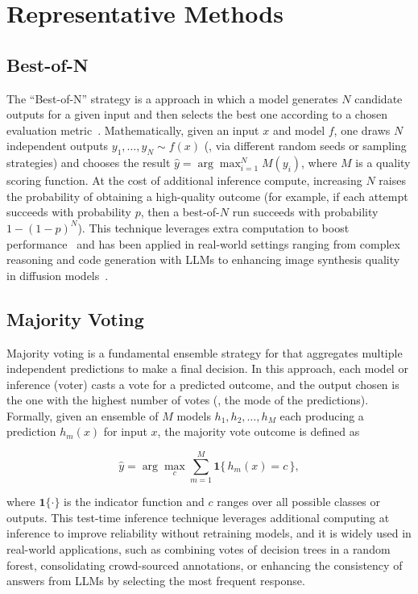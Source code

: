 
\section{Representative Methods}

\subsection{Best-of-N}

The ``Best-of-N'' strategy is a \TTS approach in which a model generates $N$ candidate outputs for a given input and then selects the best one according to a chosen evaluation metric~\citep{wu2024scaling}. Mathematically, given an input $x$ and model $f$, one draws $N$ independent outputs $y_1,\dots,y_N \sim f(x)$ (\eg, via different random seeds or sampling strategies) and chooses the result $\hat{y} = \arg\max_{i=1}^N M(y_i)$, where $M$ is a quality scoring function. At the cost of additional inference compute, increasing $N$ raises the probability of obtaining a high-quality outcome (for example, if each attempt succeeds with probability $p$, then a best-of-$N$ run succeeds with probability $1 - (1-p)^N$). This technique leverages extra computation to boost performance~\citep{kang2025scalablebestofnselectionlarge} and has been applied in real-world settings ranging from complex reasoning and code generation with LLMs to enhancing image synthesis quality in diffusion models~\citep{ma2025inferencetimescalingdiffusionmodels}.


\subsection{Majority Voting}
Majority voting is a fundamental ensemble strategy for \TTS that aggregates multiple independent predictions to make a final decision. In this approach, each model or inference (voter) casts a vote for a predicted outcome, and the output chosen is the one with the highest number of votes (\ie, the mode of the predictions). Formally, given an ensemble of $M$ models $h_1, h_2, \dots, h_M$ each producing a prediction $h_m(x)$ for input $x$, the majority vote outcome is defined as 

\[
\hat{y} = \arg\max_{c} \sum_{m=1}^{M} \mathbf{1}\{\,h_m(x) = c\,\},
\]

where $\mathbf{1\{\cdot\}}$ is the indicator function and $c$ ranges over all possible classes or outputs. This test-time inference technique leverages additional computing at inference to improve reliability without retraining models, and it is widely used in real-world applications, such as combining votes of decision trees in a random forest, consolidating crowd-sourced annotations, or enhancing the consistency of answers from LLMs by selecting the most frequent response.


